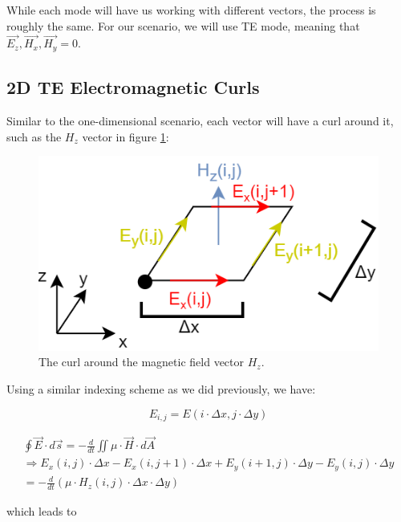 While each mode will have us working with different vectors, the process is roughly the same. For our scenario, we will use TE mode, meaning that $\vec{E_z}, \vec{H_x}, \vec{H_y} = 0$.

\subsection{2D TE Electromagnetic Curls}

Similar to the one-dimensional scenario, each vector will have a curl around it, such as the $H_z$ vector in figure \ref{fig:fdtd2dHz}:

\begin{figure}[h!]
	\centering
	\includegraphics[scale=0.6]{Figures/fdtd2dHz}
	\decoRule
	\caption[2D TE Mode - $H_z$ vector curl]{The curl around the magnetic field vector $H_z$.}
	\label{fig:fdtd2dHz}
\end{figure}

Using a similar indexing scheme as we did previously, we have:

\begin{equation}
	\label{eqn:indexing2DElectric}
	E_{i,j} = E(i \cdot \Delta x , j \cdot \Delta y)
\end{equation}

\begin{multline}
	\label{eqn:2dHzCurl1}
	\oint \vec{E} \cdot d\vec{s} = - \frac{d}{dt} \iint \mu \cdot \vec{H} \cdot d\vec{A} \\
	\Rightarrow E_x(i,j) \cdot \Delta x - E_x(i,j+1) \cdot \Delta x + E_y(i+1,j) \cdot \Delta y - E_y(i,j) \cdot \Delta y \\ = -\frac{d}{dt}(\mu \cdot H_z(i,j) \cdot \Delta x \cdot \Delta y)
\end{multline}

which leads to

